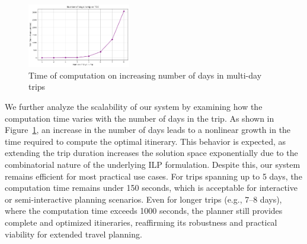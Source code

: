 \begin{figure}[H]
    \includegraphics[width=0.4\textwidth]{plots/multidayVStoc.png}
     \caption{Time of computation on increasing number of days in multi-day trips}
    \label{fig:scalability2}
\end{figure}
We further analyze the scalability of our system by examining how the computation time varies with the number of days in the trip. As shown in Figure~\ref{fig:scalability2}, an increase in the number of days leads to a nonlinear growth in the time required to compute the optimal itinerary. This behavior is expected, as extending the trip duration increases the solution space exponentially due to the combinatorial nature of the underlying ILP formulation. Despite this, our system remains efficient for most practical use cases. For trips spanning up to 5 days, the computation time remains under 150 seconds, which is acceptable for interactive or semi-interactive planning scenarios. Even for longer trips (e.g., 7–8 days), where the computation time exceeds 1000 seconds, the planner still provides complete and optimized itineraries, reaffirming its robustness and practical viability for extended travel planning.
